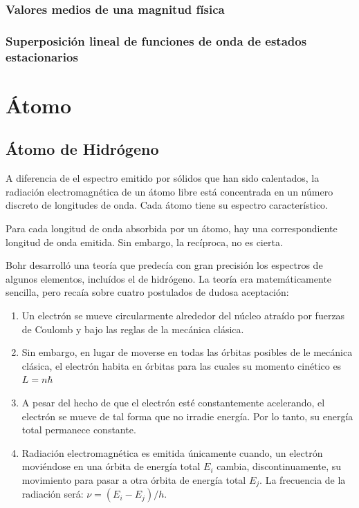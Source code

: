 \documentclass[oneside]{book}
\numberwithin{equation}{section}
\numberwithin{figure}{section}
\numberwithin{table}{section}
\begin{document}
				\subsection{Valores medios de una magnitud física}
				\subsection{Superposición lineal de funciones de onda de estados estacionarios}
	
	\chapter{Átomo}
		\section{Átomo de Hidrógeno}	
		
			A diferencia de el espectro emitido por sólidos que han sido calentados, la radiación electromagnética de un átomo libre está concentrada en un número discreto de longitudes de onda. Cada átomo tiene su espectro característico.
			
			Para cada longitud de onda absorbida por un átomo, hay una correspondiente longitud de onda emitida. Sin embargo, la recíproca, no es cierta.

			Bohr desarrolló una teoría que predecía con gran precisión los espectros de algunos elementos, incluídos el de hidrógeno. La teoría era matemáticamente sencilla, pero recaía sobre cuatro postulados de dudosa aceptación:
			
			\begin{enumerate}
				\item Un electrón se mueve circularmente alrededor del núcleo atraído por fuerzas de Coulomb y bajo las reglas de la mecánica clásica.
				\item Sin embargo, en lugar de moverse en todas las órbitas posibles de le mecánica clásica, el electrón habita en órbitas para las cuales su momento cinético es $L=n \hbar$
				\item A pesar del hecho de que el electrón esté constantemente acelerando, el electrón se mueve de tal forma que no irradie energía. Por lo tanto, su energía total permanece constante.
				\item Radiación electromagnética es emitida únicamente cuando, un electrón moviéndose en una órbita de energía total $E_{i}$ cambia, discontinuamente, su movimiento para pasar a otra órbita de energía total $E_{j}$. La frecuencia de la radiación será: $\nu=(E_{i}-E_{j})/h$.
\end{enumerate}
\end{document}
